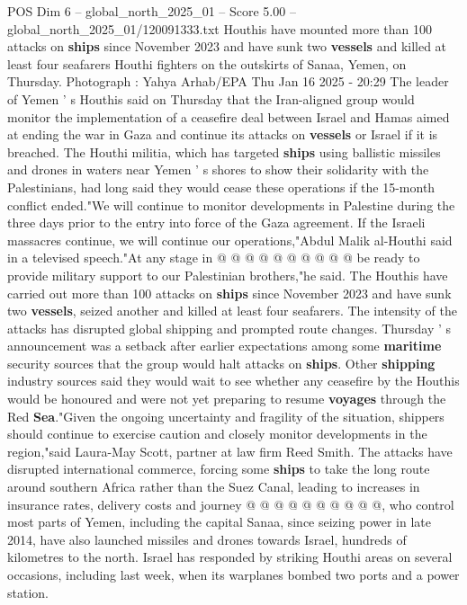 \begin{textsample}{POS Dim 6 – global\_north\_2025\_01 – Score 5.00 – global\_north\_2025\_01/120091333.txt}  \label{ex:f6_pos_278}
Houthis have mounted more than 100 attacks on \textbf{ships} since November 2023 and have sunk two \textbf{vessels} and killed at least four seafarers Houthi fighters on the outskirts of Sanaa, Yemen, on Thursday.
Photograph : Yahya Arhab/EPA Thu Jan 16 2025 - 20:29 The leader of Yemen ' s Houthis said on Thursday that the Iran-aligned group would monitor the implementation of a ceasefire deal between Israel and Hamas aimed at ending the war in Gaza and continue its attacks on \textbf{vessels} or Israel if it is breached.
The Houthi militia, which has targeted \textbf{ships} using ballistic missiles and drones in waters near Yemen ' s shores to show their solidarity with the Palestinians, had long said they would cease these operations if the 15-month conflict ended."We will continue to monitor developments in Palestine during the three days prior to the entry into force of the Gaza agreement.
If the Israeli massacres continue, we will continue our operations,"Abdul Malik al-Houthi said in a televised speech."At any stage in @ @ @ @ @ @ @ @ @ @ be ready to provide military support to our Palestinian brothers,"he said.
The Houthis have carried out more than 100 attacks on \textbf{ships} since November 2023 and have sunk two \textbf{vessels}, seized another and killed at least four seafarers.
The intensity of the attacks has disrupted global shipping and prompted route changes.
Thursday ' s announcement was a setback after earlier expectations among some \textbf{maritime} security sources that the group would halt attacks on \textbf{ships}.
Other \textbf{shipping} industry sources said they would wait to see whether any ceasefire by the Houthis would be honoured and were not yet preparing to resume \textbf{voyages} through the Red \textbf{Sea}."Given the ongoing uncertainty and fragility of the situation, shippers should continue to exercise caution and closely monitor developments in the region,"said Laura-May Scott, partner at law firm Reed Smith.
The attacks have disrupted international commerce, forcing some \textbf{ships} to take the long route around southern Africa rather than the Suez Canal, leading to increases in insurance rates, delivery costs and journey @ @ @ @ @ @ @ @ @ @, who control most parts of Yemen, including the capital Sanaa, since seizing power in late 2014, have also launched missiles and drones towards Israel, hundreds of kilometres to the north.
Israel has responded by striking Houthi areas on several occasions, including last week, when its warplanes bombed two ports and a power station.

\end{textsample}
